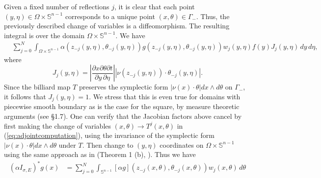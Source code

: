 \documentclass[10pt]{amsart}
\theoremstyle{definition}
\theoremstyle{definition}
\theoremstyle{definition}
\begin{document}
Given a fixed number of reflections $j$, it is clear that each point $(y, \eta) \in \Omega \times \mathbb{S}^{n-1}$ corresponds to a unique point $(x,\theta) \in \Gamma_{-}$. Thus, the previously described change of variables is a diffeomorphism. The resulting integral is over the domain $\Omega \times \mathbb{S}^{n-1}$.
We have
\begin{align*}
& \sum_{j=0}^{N}\int_{\Omega \times \mathbb{S}^{n-1}}\alpha(z_{-j}(y,\eta), \theta_{-j}(y,\eta))g(z_{-j}(y,\eta), \theta_{-j}(y,\eta))w_{j}(y,\eta)f(y) J_{j}(y,\eta)\,dy\,d\eta,
\end{align*}
where
\begin{equation*}
J_{j}(y,\eta) = \left| \frac{\partial x \partial \theta \partial t}{\partial y \, \partial \eta}\right| |\nu(z_{-j}(y,\eta))\cdot \theta_{-j}(y,\eta)|.
\end{equation*}
Since the billiard map $T$ preserves the symplectic form $|\nu(x) \cdot \theta| dx \wedge d\theta$ on $\Gamma_{-}$, it follows that $J_{j}(y,\eta) = 1$. We stress that this is even true for domains with piecewise smooth boundary as is the case for the square, by measure theoretic arguments (see \cite{serge2} \S 1.7). One can verify that the Jacobian factors above cancel by first making the change of variables $(x,\theta)\to T^{j}(x,\theta)$ in (\ref{eq:adjointcomputation}), using the invariance of the symplectic form $|\nu(x)\cdot \theta| dx\wedge d\theta$ under $T$. Then change to $(y,\eta)$ coordinates on $\Omega \times \mathbb{S}^{n-1}$ using the same approach as in (Theorem 1 (b), \cite{inversesource}). Thus we have
\begin{align}
(\alpha I_{\sigma, E})^{*}g(x) & = \sum_{j=0}^{N}\int_{\mathbb{S}^{n-1}}[\alpha g](z_{-j}(x,\theta), \theta_{-j}(x,\theta)) w_{j}(x,\theta) \,d\theta
\end{align}
\end{document}
